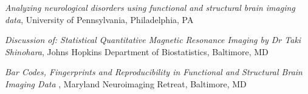 \documentclass[12pt]{article}
\begin{document}
\begin{description}
\begin{description}
	\end{description}
\item[\textnormal{2015}]     
    \begin{description}
	\item {\it Analyzing neurological disorders using functional and structural brain imaging data}, University of Pennsylvania, Philadelphia, PA
	\item {\it Discussion of: Statistical Quantitative Magnetic Resonance Imaging by Dr Taki Shinohara}, Johns Hopkins Department of Biostatistics, Baltimore, MD
	\end{description}
\item[\textnormal{2016}]
    \begin{description}
        \item {\it Bar Codes, Fingerprints and Reproducibility in Functional and Structural Brain Imaging Data }, Maryland Neuroimaging Retreat, Baltimore, MD
    \end{description}
\end{description}
\end{document}

